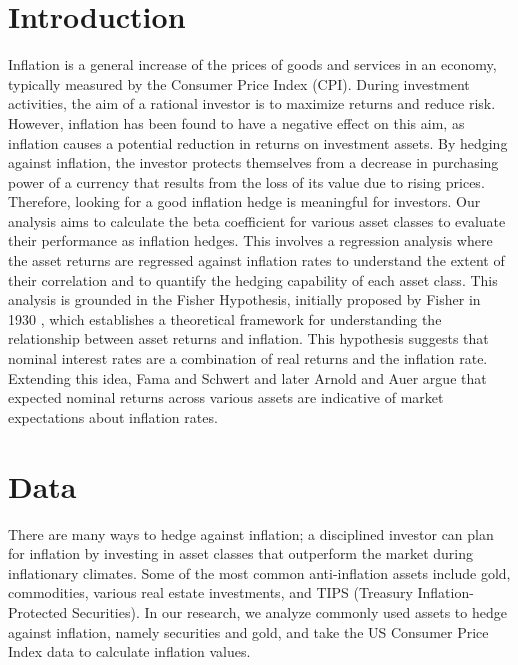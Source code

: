 \documentclass{article}
\begin{document}
\section{Introduction} Inflation is a general increase of the prices of goods and services in an economy, typically measured by the Consumer Price Index (CPI). During investment activities, the aim of a rational investor is to maximize returns and reduce risk. However, inflation has been found to have a negative effect on this aim, as inflation causes a potential reduction in returns on investment assets. By hedging against inflation, the investor protects themselves from a decrease in purchasing power of a currency that results from the loss of its value due to rising prices. Therefore, looking for a good inflation hedge is meaningful for investors. Our analysis aims to calculate the beta coefficient for various asset classes to evaluate their performance as inflation hedges. This involves a regression analysis where the asset returns are regressed against inflation rates to understand the extent of their correlation and to quantify the hedging capability of each asset class. This analysis is grounded in the Fisher Hypothesis, initially proposed by Fisher in 1930 \cite{fisher1930theory}, which establishes a theoretical framework for understanding the relationship between asset returns and inflation. This hypothesis suggests that nominal interest rates are a combination of real returns and the inflation rate. Extending this idea, Fama and Schwert \cite{FAMA1977115} and later Arnold and Auer \cite{ARNOLD2015187} argue that expected nominal returns across various assets are indicative of market expectations about inflation rates.

\section{Data}
There are many ways to hedge against inflation; a disciplined investor can plan for inflation by investing in asset classes that outperform the market during inflationary climates. Some of the most common anti-inflation assets include gold, commodities, various real estate investments, and TIPS (Treasury Inflation-Protected Securities). In our research, we analyze commonly used assets to hedge against inflation, namely securities and gold, and take the US Consumer Price Index data to calculate inflation values.
\end{document}
